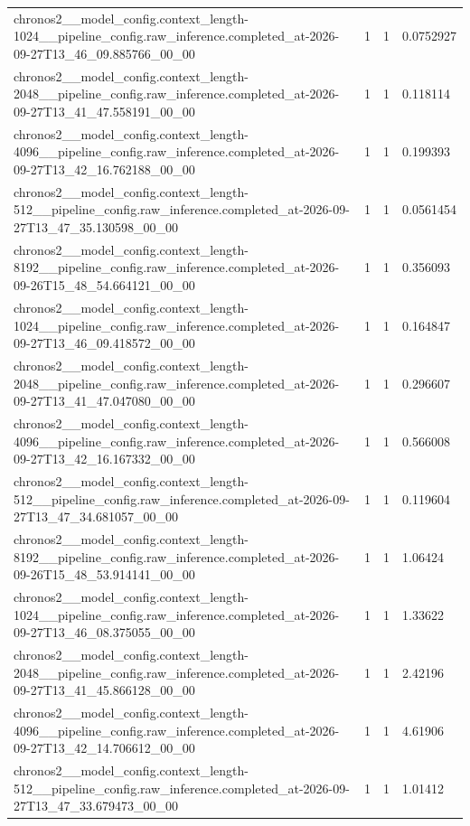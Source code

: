\begin{tabular}{llll}
chronos2\_\_model\_config.context\_length-1024\_\_pipeline\_config.raw\_inference.completed\_at-2026-09-27T13\_46\_09.885766\_00\_00 & 1 & 1 & 0.0752927 \\
chronos2\_\_model\_config.context\_length-2048\_\_pipeline\_config.raw\_inference.completed\_at-2026-09-27T13\_41\_47.558191\_00\_00 & 1 & 1 & 0.118114 \\
chronos2\_\_model\_config.context\_length-4096\_\_pipeline\_config.raw\_inference.completed\_at-2026-09-27T13\_42\_16.762188\_00\_00 & 1 & 1 & 0.199393 \\
chronos2\_\_model\_config.context\_length-512\_\_pipeline\_config.raw\_inference.completed\_at-2026-09-27T13\_47\_35.130598\_00\_00 & 1 & 1 & 0.0561454 \\
chronos2\_\_model\_config.context\_length-8192\_\_pipeline\_config.raw\_inference.completed\_at-2026-09-26T15\_48\_54.664121\_00\_00 & 1 & 1 & 0.356093 \\
chronos2\_\_model\_config.context\_length-1024\_\_pipeline\_config.raw\_inference.completed\_at-2026-09-27T13\_46\_09.418572\_00\_00 & 1 & 1 & 0.164847 \\
chronos2\_\_model\_config.context\_length-2048\_\_pipeline\_config.raw\_inference.completed\_at-2026-09-27T13\_41\_47.047080\_00\_00 & 1 & 1 & 0.296607 \\
chronos2\_\_model\_config.context\_length-4096\_\_pipeline\_config.raw\_inference.completed\_at-2026-09-27T13\_42\_16.167332\_00\_00 & 1 & 1 & 0.566008 \\
chronos2\_\_model\_config.context\_length-512\_\_pipeline\_config.raw\_inference.completed\_at-2026-09-27T13\_47\_34.681057\_00\_00 & 1 & 1 & 0.119604 \\
chronos2\_\_model\_config.context\_length-8192\_\_pipeline\_config.raw\_inference.completed\_at-2026-09-26T15\_48\_53.914141\_00\_00 & 1 & 1 & 1.06424 \\
chronos2\_\_model\_config.context\_length-1024\_\_pipeline\_config.raw\_inference.completed\_at-2026-09-27T13\_46\_08.375055\_00\_00 & 1 & 1 & 1.33622 \\
chronos2\_\_model\_config.context\_length-2048\_\_pipeline\_config.raw\_inference.completed\_at-2026-09-27T13\_41\_45.866128\_00\_00 & 1 & 1 & 2.42196 \\
chronos2\_\_model\_config.context\_length-4096\_\_pipeline\_config.raw\_inference.completed\_at-2026-09-27T13\_42\_14.706612\_00\_00 & 1 & 1 & 4.61906 \\
chronos2\_\_model\_config.context\_length-512\_\_pipeline\_config.raw\_inference.completed\_at-2026-09-27T13\_47\_33.679473\_00\_00 & 1 & 1 & 1.01412 \\

\end{tabular}
